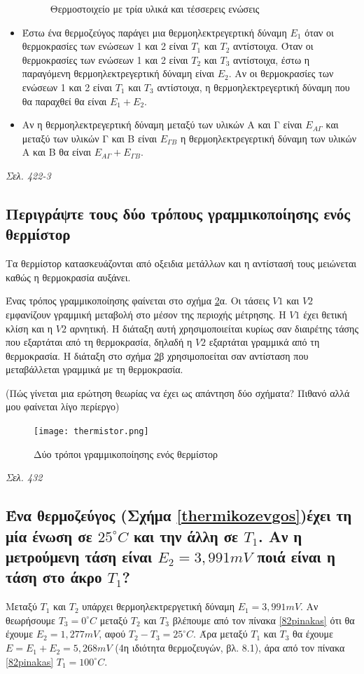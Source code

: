 \documentclass{article}
\begin{document}
\begin{itemize}
\begin{figure}[h!]
            \caption{Θερμοστοιχείο με τρία υλικά και τέσσερεις ενώσεις}
            \label{fig:7.1thermo2}
        \end{figure}
    \item Έστω ένα θερμοζεύγος παράγει μια θερμοηλεκτρεγερτική δύναμη $Ε_1$ όταν οι θερμοκρασίες των ενώσεων 1 και 2 είναι $Τ_1$ και $Τ_2$ αντίστοιχα. Όταν οι θερμοκρασίες των ενώσεων
        1 και 2 είναι $Τ_2$ και $Τ_3$ αντίστοιχα, έστω η παραγόμενη θερμοηλεκτρεγερτική δύναμη είναι $Ε_2$. Αν οι θερμοκρασίες των ενώσεων 1 και 2 είναι $Τ_1$ και $Τ_3$ αντίστοιχα, η
        θερμοηλεκτρεγερτική δύναμη που θα παραχθεί θα είναι $Ε_1+Ε_2$.
    \item Αν η θερμοηλεκτρεγερτική δύναμη μεταξύ των υλικών Α και Γ είναι $Ε_{A\Gamma}$ και μεταξύ των υλικών Γ και Β είναι $Ε_{\Gamma B}$ η θερμοηλεκτρεγερτική δύναμη των
        υλικών Α και Β θα είναι $Ε_{A\Gamma} + E_{\Gamma B}$.
\end{itemize}

\emph{Σελ. 422-3}

\subsection{Περιγράψτε τους δύο τρόπους γραμμικοποίησης ενός θερμίστορ}
Τα θερμίστορ κατασκευάζονται από οξειδια μετάλλων και η αντίστασή τους μειώνεται καθώς η θερμοκρασία αυξάνει. 

Ένας τρόπος γραμμικοποίησης φαίνεται στο σχήμα \ref{thermistor}α. Οι τάσεις $V1$ και $V2$ εμφανίζουν γραμμική μεταβολή στο μέσον της περιοχής μέτρησης. Η $V1$ έχει 
θετική κλίση και η $V2$ αρνητική. Η διάταξη αυτή χρησιμοποιείται κυρίως σαν διαιρέτης τάσης που εξαρτάται από τη θερμοκρασία, δηλαδή η $V2$ εξαρτάται γραμμικά από 
τη θερμοκρασία. Η διάταξη στο σχήμα \ref{thermistor}β χρησιμοποείται σαν αντίσταση που μεταβάλλεται γραμμικά με τη θερμοκρασία.

(Πώς γίνεται μια ερώτηση θεωρίας να έχει ως απάντηση δύο σχήματα? Πιθανό αλλά μου φαίνεται λίγο περίεργο)

\begin{figure}[h!]
    \texttt{[image: thermistor.png]}
    \caption{Δύο τρόποι γραμμικοποίησης ενός θερμίστορ}
    \label{thermistor}
\end{figure}

\emph{Σελ. 432}

\subsection{Ένα θερμοζεύγος (Σχήμα \ref{thermikozevgos})έχει τη μία ένωση σε $25^{\circ} C$ και την άλλη σε $Τ_1$. Αν η μετρούμενη τάση είναι $E_2=3,991mV$ 
ποιά είναι η τάση στο άκρο $T_1$?}
Μεταξύ $Τ_1$ και $Τ_2$ υπάρχει θερμοηλεκτρεργετική δύναμη $Ε_1 = 3,991 mV$. Αν θεωρήσουμε $T_3 = 0^{\circ}C$ μεταξύ $T_2$ και $T_3$ βλέπουμε από τον πίνακα 
\ref{82pinakas} ότι θα έχουμε $E_2 = 1,277mV$, αφού $T_2 - T_3 = 25^{\circ}C$. Άρα μεταξύ $T_1$ και $T_3$ θα έχουμε $E = E_1 + E_2 = 5,268mV$ (4η ιδιότητα 
θερμοζευγών, βλ. 8.1), άρα από τον πίνακα \ref{82pinakas} $T_1 = 100^{\circ}C$.
\end{document}
